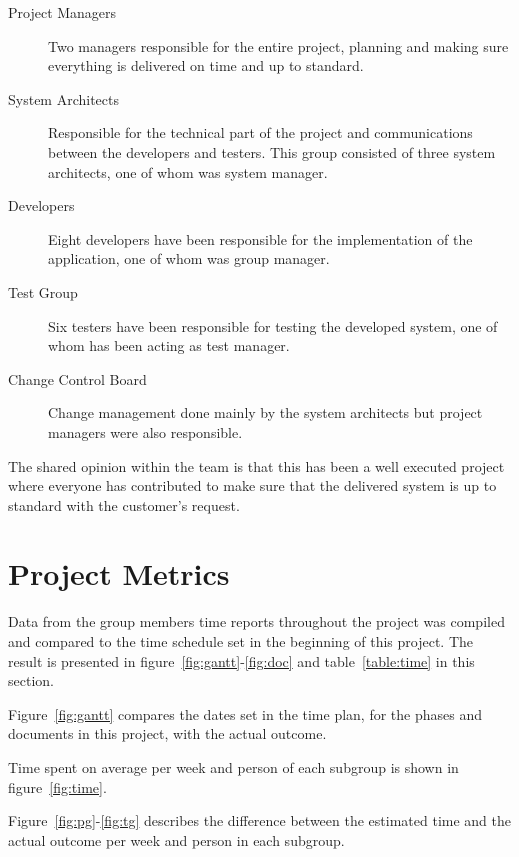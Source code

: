 \documentclass[a4paper]{article}
\begin{document}
\begin{description}
\item[Project Managers] Two managers responsible for the entire project, planning and making sure everything is delivered on time and up to standard.
\item[System Architects] Responsible for the technical part of the project and communications between the developers and testers. This group consisted of three system architects, one of whom was system manager.
\item[Developers] Eight developers have been responsible for the implementation of the application, one of whom was group manager.
\item[Test Group] Six testers have been responsible for testing the developed system, one of whom has been acting as test manager.
\item[Change Control Board] Change management done mainly by the system architects but project managers were also responsible.
\end{description}

The shared opinion within the team is that this has been a well executed project where everyone has contributed to make sure that the delivered system is up to standard with the customer's request.  

\newpage
\section{Project Metrics}
\label{sec:metr}
 
Data from the group members time reports throughout the project was compiled and compared to the time schedule set in the beginning of this project. The result is presented in figure~\ref{fig:gantt}-\ref{fig:doc} and table~\ref{table:time} in this section.

Figure~\ref{fig:gantt} compares the dates set in the time plan, for the phases and documents in this project, with the actual outcome.

Time spent on average per week and person of each subgroup is shown in figure~\ref{fig:time}.

Figure~\ref{fig:pg}-\ref{fig:tg} describes the difference between the estimated time and the actual outcome per week and person in each subgroup.  
\end{document}
